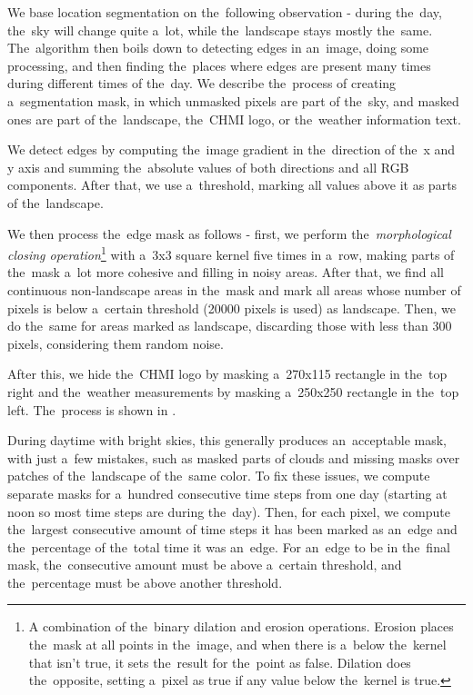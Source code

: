 We base location segmentation on the~following observation - during the~day, the~sky will change quite a~lot, while the~landscape stays mostly the~same. The~algorithm then boils down to detecting edges in an~image, doing some processing, and then finding the~places where edges are present many times during different times of the~day. We describe the~process of creating a~segmentation mask, in which unmasked pixels are part of the~sky, and masked ones are part of the~landscape, the~CHMI logo, or the~weather information text.

We detect edges by computing the~image gradient in the~direction of the~x and y axis and summing the~absolute values of both directions and all RGB components. After that, we use a~threshold, marking all values above it as parts of the~landscape.

We then process the~edge mask as follows - first, we perform the~\textit{morphological closing operation}\footnote{A combination of the~binary dilation and erosion operations. Erosion places the~mask at all points in the~image, and when there is a~below the~kernel that isn't true, it sets the~result for the~point as false. Dilation does the~opposite, setting a~pixel as true if any value below the~kernel is true.} with a~3x3 square kernel five times in a~row, making parts of the~mask a~lot more cohesive and filling in noisy areas. After that, we find all continuous non-landscape areas in the~mask and mark all areas whose number of pixels is below a~certain threshold (20000 pixels is used) as landscape. Then, we do the~same for areas marked as landscape, discarding those with less than 300 pixels, considering them random noise.

After this, we hide the~CHMI logo by masking a~270x115 rectangle in the~top right and the~weather measurements by masking a~250x250 rectangle in the~top left. The~process is shown in .


During daytime with bright skies, this generally produces an~acceptable mask, with just a~few mistakes, such as masked parts of clouds and missing masks over patches of the~landscape of the~same color. To fix these issues, we compute separate masks for a~hundred consecutive time steps from one day (starting at noon so most time steps are during the~day). Then, for each pixel, we compute the~largest consecutive amount of time steps it has been marked as an~edge and the~percentage of the~total time it was an~edge. For an~edge to be in the~final mask, the~consecutive amount must be above a~certain threshold, and the~percentage must be above another threshold.

